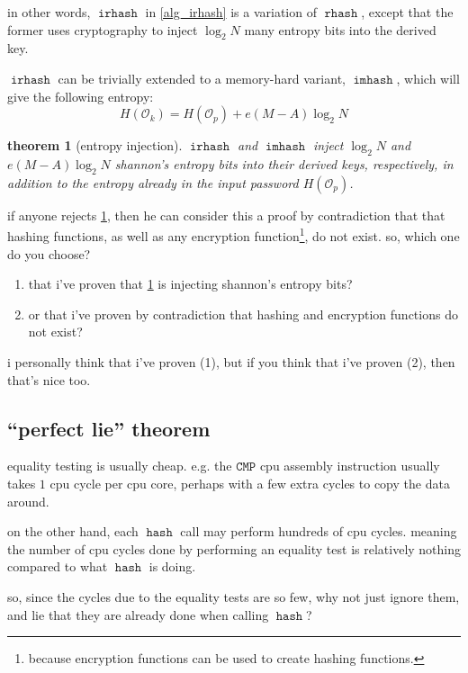 \documentclass[twocolumn]{article}
\newtheorem{theorem}{theorem}[section]
\DeclareMathOperator{\hash}{\mathtt{hash}}
\DeclareMathOperator{\rhash}{\mathtt{rhash}}
\DeclareMathOperator{\irhash}{\mathtt{irhash}}
\DeclareMathOperator{\imhash}{\mathtt{imhash}}
\begin{document}
in other words, $\irhash$ in \cref{alg_irhash} is a variation of $\rhash$,
except that the former uses cryptography to inject $\log_2 N$ many entropy
bits into the derived key.

$\irhash$ can be trivially extended to a memory-hard variant, $\imhash$,
which will give the following entropy:
\begin{equation}
    H(\mathcal{O}_k) = H(\mathcal{O}_p) + e(M-A)\log_2 N
\end{equation}

\begin{theorem}[entropy injection]\label{theorem_entropy_injection}
    $\irhash$ and $\imhash$ inject $\log_2 N$ and $e(M-A)\log_2 N$
    shannon's entropy bits into their derived keys, respectively, in
    addition to the entropy already in the input password
    $H(\mathcal{O}_p)$.
\end{theorem}

if anyone rejects \cref{theorem_entropy_injection}, then he can consider
this a proof by contradiction that that hashing functions, as well as any
encryption function\footnote{because encryption functions can be used to
create hashing functions.}, do not exist.  so, which one do you choose?  
\begin{enumerate}
    \item that i've proven that \cref{theorem_entropy_injection} is
    injecting shannon's entropy bits?

    \item or that i've proven by contradiction that hashing and encryption
    functions do not exist?
\end{enumerate}

i personally think that i've proven (1), but if you think that i've proven
(2), then that's nice too.

\subsection{``perfect lie'' theorem}
equality testing is usually cheap.  e.g. the $\texttt{CMP}$ cpu assembly
instruction usually takes $1$ cpu cycle per cpu core, perhaps with a few
extra cycles to copy the data around.  

on the other hand, each $\hash$ call may perform hundreds of cpu cycles.
meaning the number of cpu cycles done by performing an equality test is
relatively nothing compared to what $\hash$ is doing.

so, since the cycles due to the equality tests are so few, why not just
ignore them, and lie that they are already done when calling $\hash$?
\end{document}
